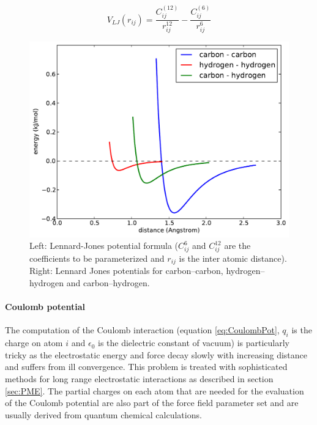 \documentclass[english, a4paper, 12pt, titlepage, draft]{article}
\begin{document}
\begin{figure}
    \begin{minipage}[]{0.45\linewidth}
        \centering
        \vfill
        \begin{equation}
            V_{LJ}(r_{ij}) = \frac{C^{(12)}_{ij}}{r^{12}_{ij}} - \frac{C^{(6)}_{ij}}{r^{6}_{ij}}
            \label{eq:LJ}
        \end{equation} 
        \vfill 
    \end{minipage}
\hspace{0.5cm}
    \begin{minipage}[]{0.45\linewidth}
        \centering
        \includegraphics[width=\textwidth]{figures/Lennard_Jones/Lennard_Jones.pdf} 
    \end{minipage}
    \caption{Left: Lennard-Jones potential formula ($C^{6}_{ij}$ and $C^{12}_{ij}$ are the coefficients to be parameterized and $r_{ij}$ is the inter atomic distance). Right: Lennard Jones potentials for carbon--carbon, hydrogen--hydrogen and carbon--hydrogen.}
\label{fig:LJ}
\end{figure}


\paragraph{Coulomb potential}
The computation of the Coulomb interaction (equation \ref{eq:CoulombPot}, $q_i$ is the charge on atom $i$ and $\epsilon_0$ is the dielectric constant of vacuum) is particularly tricky as the electrostatic energy and force decay slowly with increasing distance and suffers from ill convergence.
This problem is treated with sophisticated methods for long range electrostatic interactions as described in section \ref{sec:PME}.
The partial charges on each atom that are needed for the evaluation of the Coulomb potential are also part of the force field parameter set and are usually derived from quantum chemical calculations.
\end{document}
